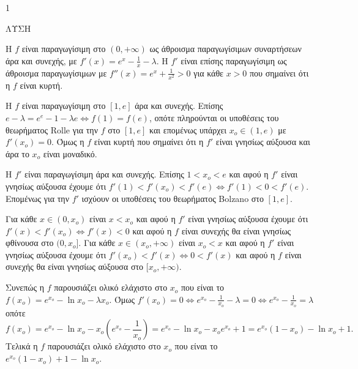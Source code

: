 \begin{ylh}{1}
    \item [Ύλη από εικόνα]
\end{ylh}
ΛΥΣΗ

\begin{alist}
\item Η $f$ είναι παραγωγίσιμη στο $(0,+\infty)$ ως άθροισμα παραγωγίσιμων συναρτήσεων άρα και συνεχής, με $f'(x)=e^x-\frac{1}{x}-\lambda$. Η $f'$ είναι επίσης παραγωγίσιμη ως άθροισμα παραγωγίσιμων με $f''(x)=e^x+\frac{1}{x^2}>0$ για κάθε $x>0$ που σημαίνει ότι η $f$ είναι κυρτή.
\item Η $f$ είναι παραγωγίσιμη στο $[1,e]$ άρα και συνεχής. Επίσης $e-\lambda=e^e-1-\lambda e \Leftrightarrow f(1)=f(e)$, οπότε πληρούνται οι υποθέσεις του θεωρήματος Rolle για την $f$ στο $[1,e]$ και επομένως υπάρχει $x_o \in (1,e)$ με $f'(x_o)=0$. Όμως η $f$ είναι κυρτή που σημαίνει ότι η $f'$ είναι γνησίως αύξουσα και άρα το $x_o$ είναι μοναδικό.
\item Η $f'$ είναι παραγωγίσιμη άρα και συνεχής. Επίσης $1<x_o<e$ και αφού η $f'$ είναι γνησίως αύξουσα έχουμε ότι $f'(1)<f'(x_o)<f'(e) \Leftrightarrow f'(1)<0<f'(e)$. Επομένως για την $f'$ ισχύουν οι υποθέσεις του θεωρήματος Bolzano στο $[1,e]$.
\item Για κάθε $x \in (0,x_o)$ είναι $x<x_o$ και αφού η $f'$ είναι γνησίως αύξουσα έχουμε ότι $f'(x)<f'(x_o) \Leftrightarrow f'(x)<0$ και αφού η $f$ είναι συνεχής θα είναι γνησίως φθίνουσα στο $(0,x_o]$.
Για κάθε $x \in (x_o,+\infty)$ είναι $x_o<x$ και αφού η $f'$ είναι γνησίως αύξουσα έχουμε ότι $f'(x_o)<f'(x) \Leftrightarrow 0<f'(x)$ και αφού η $f$ είναι συνεχής θα είναι γνησίως αύξουσα στο $[x_o,+\infty)$.
\end{alist}
Συνεπώς η $f$ παρουσιάζει ολικό ελάχιστο στο $x_o$ που είναι το $f(x_o)=e^{x_o}-\ln x_o-\lambda x_o$. Όμως $f'(x_o)=0 \Leftrightarrow e^{x_o}-\frac{1}{x_o}-\lambda=0 \Leftrightarrow e^{x_o}-\frac{1}{x_o}=\lambda$ οπότε
\[ f(x_o)=e^{x_o}-\ln x_o-x_o\left(e^{x_o}-\frac{1}{x_o}\right)=e^{x_o}-\ln x_o-x_o e^{x_o}+1=e^{x_o}(1-x_o)-\ln x_o+1. \]
Τελικά η $f$ παρουσιάζει ολικό ελάχιστο στο $x_o$ που είναι το $e^{x_o}(1-x_o)+1-\ln x_o$.
